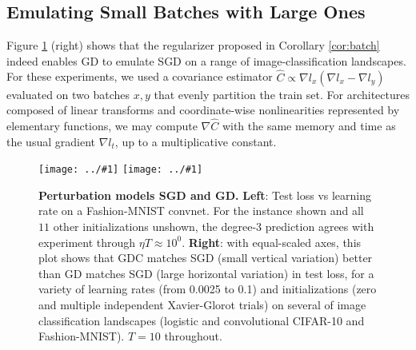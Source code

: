 \documentclass{article}
\theoremstyle{plain}
\theoremstyle{definition}
\newcommand{\plotmoow}[3]{\texttt{[image: ../\#1]}}
\begin{document}
    \subsection{Emulating Small Batches with Large Ones}
        Figure \ref{fig:vanillaandbatch} (right) shows that the regularizer
        proposed in Corollary \ref{cor:batch} indeed enables GD to emulate SGD
        on a range of image-classification landscapes.  For these experiments,
        we used a covariance estimator $\hat C \propto \nabla l_x (\nabla l_x -
        \nabla l_y)$ evaluated on two batches $x, y$ that evenly partition the
        train set.  For architectures composed of linear transforms and
        coordinate-wise nonlinearities represented by elementary functions, we
        may compute $\nabla \hat C$ with the same memory and time as the usual
        gradient $\nabla l_t$, up to a multiplicative constant. 
        \begin{figure}[h!] 
            \centering
            \plotmoow{plots/new-test-0}{0.48\columnwidth}{3.0cm} 
            \plotmoow{plots/new-big-bm-new}{0.48\columnwidth}{4.0cm}
            \caption{
                {\bf Perturbation models SGD and GD.}
                {\bf Left}: Test loss vs learning rate on a Fashion-MNIST
                convnet.  For the instance shown and all $11$ other
                initializations unshown, the degree-$3$ prediction agrees with
                experiment through $\eta T \approx 10^0$.
                {\bf Right}: with equal-scaled axes, this plot shows that GDC
                matches SGD (small vertical variation) better than GD matches
                SGD (large horizontal variation) in test loss, for a variety of
                learning rates (from 0.0025 to 0.1) and initializations (zero
                and multiple independent Xavier-Glorot trials) on several of
                image classification landscapes (logistic and convolutional
                CIFAR-10 and Fashion-MNIST).  $T=10$ throughout.
            }
            \label{fig:vanillaandbatch}
        \end{figure}
  
\end{document}
